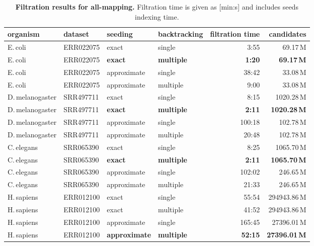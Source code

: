 \begin{table*}[h]
  \center
  \caption{
    \label{tab:Filtration}%
    \textbf{Filtration results for all-mapping.}
    Filtration time is given as [min:s] and includes seeds indexing time.
  }
  {
  \sffamily
  \footnotesize
  \begin{tabular}{llllrr}
    \toprule
	organism & dataset & seeding & backtracking & filtration time & candidates\\
    \midrule
E.\,coli & ERR022075 & exact & single & 3:55 & 69.17\,M\\
E.\,coli & ERR022075 & \textbf{exact} & \textbf{multiple} & \textbf{1:20} & \textbf{69.17\,M}\\
E.\,coli & ERR022075 & approximate & single & 38:42 & 33.08\,M\\
E.\,coli & ERR022075 & approximate & multiple & 9:00 & 33.08\,M\\
    \midrule
D.\,melanogaster & SRR497711 & exact & single & 8:15 & 1020.28\,M\\
D.\,melanogaster & SRR497711 & \textbf{exact} & \textbf{multiple} & \textbf{2:11} & \textbf{1020.28\,M}\\
D.\,melanogaster & SRR497711 & approximate & single & 100:18 & 102.78\,M\\
D.\,melanogaster & SRR497711 & approximate & multiple & 20:48 & 102.78\,M\\
    \midrule
C.\,elegans & SRR065390 & exact & single & 8:25 & 1065.70\,M\\
C.\,elegans & SRR065390 & \textbf{exact} & \textbf{multiple} & \textbf{2:11} & \textbf{1065.70\,M}\\
C.\,elegans & SRR065390 & approximate & single & 102:02 & 246.65\,M\\
C.\,elegans & SRR065390 & approximate & multiple & 21:33 & 246.65\,M\\
	\midrule
H.\,sapiens & ERR012100 & exact & single & 55:54 & 294943.86\,M\\
H.\,sapiens & ERR012100 & exact & multiple & 41:52 & 294943.86\,M\\
H.\,sapiens & ERR012100 & approximate & single & 165:45 & 27396.01\,M\\
H.\,sapiens & ERR012100 & \textbf{approximate} & \textbf{multiple} & \textbf{52:15} & \textbf{27396.01\,M}\\
    \bottomrule
  \end{tabular}
  }
  \vspace{2mm}
\end{table*}

